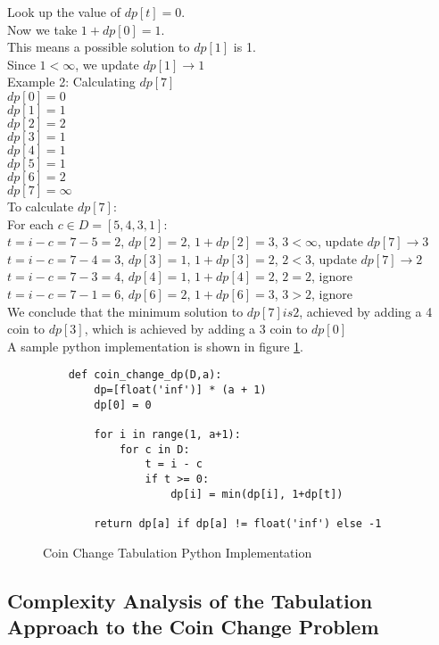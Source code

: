 Look up the value of $dp[t] = 0$.\\
Now we take $1 + dp[0] = 1$.\\
This means a possible solution to $dp[1]$ is 1.\\
Since $1 < \infty$, we update $dp[1] \rightarrow 1$\\
Example 2: Calculating $dp[7]$\\
$dp[0]=0$\\
$dp[1]=1$\\
$dp[2]=2$\\
$dp[3]=1$\\
$dp[4]=1$\\
$dp[5]=1$\\
$dp[6]=2$\\
$dp[7]=\infty$\\
To calculate $dp[7]$:\\
For each $c \in D = [5,4,3,1]$:\\
$t = i-c = 7-5 = 2$, $dp[2] = 2$, $1 + dp[2] = 3$, $3 < \infty$, update $dp[7] \rightarrow 3$\\
$t = i-c = 7-4 = 3$, $dp[3] = 1$, $1+dp[3] = 2$, $2 < 3$, update $dp[7] \rightarrow 2$\\
$t = i-c = 7-3 = 4$, $dp[4] = 1$, $1+dp[4] = 2$, $2 = 2$, ignore\\
$t = i-c = 7-1 = 6$, $dp[6] = 2$, $1+dp[6] = 3$, $3 > 2$, ignore\\
We conclude that the minimum solution to $dp[7] is 2$, achieved by adding a 4 coin to $dp[3]$, which is achieved by adding a 3 coin to $dp[0]$\\
A sample python implementation is shown in figure \ref{fig:coin-change-dp}.\\

\begin{figure}[H]
    \centering
    \begin{lstlisting}
    def coin_change_dp(D,a):
        dp=[float('inf')] * (a + 1)
        dp[0] = 0
    
        for i in range(1, a+1):
            for c in D:
                t = i - c
                if t >= 0:
                    dp[i] = min(dp[i], 1+dp[t])
    
        return dp[a] if dp[a] != float('inf') else -1
    \end{lstlisting}
    \caption{Coin Change Tabulation Python Implementation}
    \label{fig:coin-change-dp}
\end{figure}

\subsection{Complexity Analysis of the Tabulation Approach to the Coin Change Problem}


